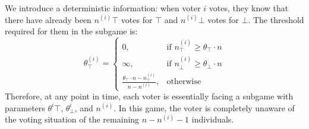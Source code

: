 \documentclass[11pt]{article}
\begin{document}
We introduce a deterministic information: when voter $i$ votes, they know that there have already been $n^{(i)}\top$ votes for $\top$ and $n^{(i)}\bot$ votes for $\bot$. The threshold required for them in the subgame is:
\begin{equation}
  \theta^{(i)}_\top = 
  \begin{cases}
    0, & \text{if } n^{(i)}_\top \geq \theta_\top\cdot n \\
    \infty, & \text{if } n^{(i)}_\bot \geq \theta_\bot\cdot n \\
    \frac{\theta_\top\cdot n - n^{(i)}_\top}{n - n^{(i)}}, & \text{otherwise}
  \end{cases}
\end{equation}
Therefore, at any point in time, each voter is essentially facing a subgame with parameters $\theta^i\top$, $\theta^i_\bot$, and $n^{(i)}$. In this game, the voter is completely unaware of the voting situation of the remaining $n-n^{(i)}-1$ individuals.
\end{document}
